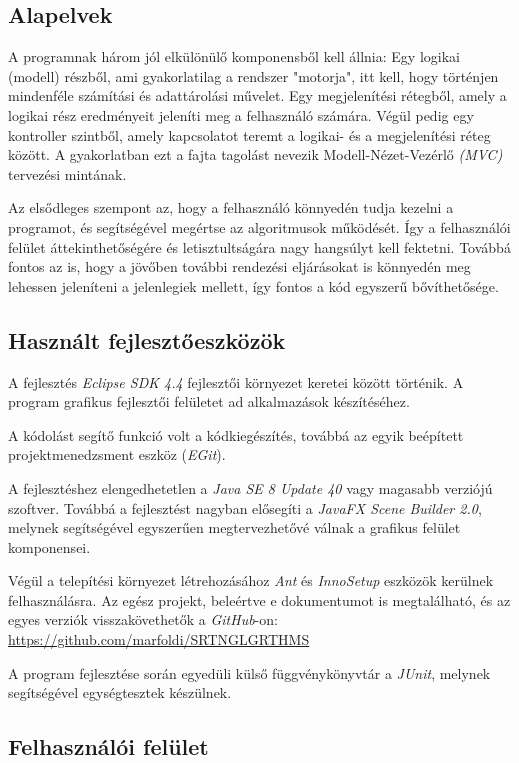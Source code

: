 \documentclass{elteikthesis}
\begin{document}
\subsection{Alapelvek}
A programnak három jól elkülönülő komponensből kell állnia:
Egy logikai (modell) részből, ami gyakorlatilag a rendszer "motorja", itt kell, hogy történjen mindenféle számítási és adattárolási művelet. Egy megjelenítési rétegből, amely a logikai rész eredményeit jeleníti meg a felhasználó számára. Végül pedig egy kontroller szintből, amely kapcsolatot teremt a logikai- és a megjelenítési réteg között. A gyakorlatban ezt a fajta tagolást nevezik Modell-Nézet-Vezérlő \emph{(MVC)} tervezési mintának.\par
Az elsődleges szempont az, hogy a felhasználó könnyedén tudja kezelni a programot, és segítségével megértse az algoritmusok működését. Így a felhasználói felület áttekinthetőségére és letisztultságára nagy hangsúlyt kell fektetni. Továbbá fontos az is, hogy a jövőben további rendezési eljárásokat is könnyedén meg lehessen jeleníteni a jelenlegiek mellett, így fontos a kód egyszerű bővíthetősége.

\subsection{Használt fejlesztőeszközök}
A fejlesztés \emph{Eclipse SDK 4.4} fejlesztői környezet keretei között történik. A program grafikus fejlesztői felületet ad alkalmazások készítéséhez.\par
A kódolást segítő funkció volt a kódkiegészítés, továbbá az egyik beépített projektmenedzsment eszköz (\emph{EGit}).\par
A fejlesztéshez elengedhetetlen a \emph{Java SE 8 Update 40} vagy magasabb verziójú szoftver. Továbbá a fejlesztést nagyban elősegíti a \emph{JavaFX Scene Builder 2.0}, melynek segítségével egyszerűen megtervezhetővé válnak a grafikus felület komponensei.\par
Végül a telepítési környezet létrehozásához \emph{Ant} és \emph{InnoSetup} eszközök kerülnek felhasználásra.
Az egész projekt, beleértve e dokumentumot is megtalálható, és az egyes verziók visszakövethetők a \emph{GitHub}-on: \url{https://github.com/marfoldi/SRTNGLGRTHMS}\par
A program fejlesztése során egyedüli külső függvénykönyvtár a \emph{JUnit}, melynek segítségével egységtesztek készülnek.

\subsection{Felhasználói felület}
\end{document}
